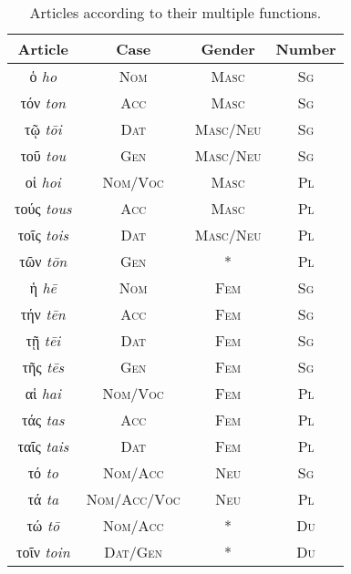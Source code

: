 \documentclass[10pt]{memoir}
\newcommand{\tsc}[1]{\textsc{#1}}
\newcommand{\grc}[1]{\fontspec{Inter}#1}
\newcommand{\trc}[1]{\textit{\fontspec{Tinos}#1}}
\begin{document}
    \begin{table}[H]
        \begin{tabular}{c|ccc}
            \textbf{Article} & \textbf{Case} & \textbf{Gender} & \textbf{Number} \\
            \hline
            \grc{ὁ} \trc{ho}           & \tsc{Nom}           & \tsc{Masc}            & \tsc{Sg}              \\
            \grc{τόν} \trc{ton}        & \tsc{Acc}           & \tsc{Masc}            & \tsc{Sg}              \\
            \grc{τῷ} \trc{tōi}         & \tsc{Dat}           & \tsc{Masc}/\tsc{Neu}        & \tsc{Sg}              \\
            \grc{τοῦ} \trc{tou}        & \tsc{Gen}           & \tsc{Masc}/\tsc{Neu}        & \tsc{Sg}              \\
            \grc{οἱ} \trc{hoi}         & \tsc{Nom}/\tsc{Voc}       & \tsc{Masc}            & \tsc{Pl}              \\
            \grc{τούς} \trc{tous}      & \tsc{Acc}           & \tsc{Masc}            & \tsc{Pl}              \\
            \grc{τοῖς} \trc{tois}      & \tsc{Dat}           & \tsc{Masc}/\tsc{Neu}        & \tsc{Pl}              \\
            \grc{τῶν} \trc{tōn}        & \tsc{Gen}           & *             & \tsc{Pl}              \\
            \grc{ἡ} \trc{hē}           & \tsc{Nom}           & \tsc{Fem}             & \tsc{Sg}              \\
            \grc{τήν} \trc{tēn}        & \tsc{Acc}           & \tsc{Fem}             & \tsc{Sg}              \\
            \grc{τῇ} \trc{tēi}         & \tsc{Dat}           & \tsc{Fem}             & \tsc{Sg}              \\
            \grc{τῆς} \trc{tēs}        & \tsc{Gen}           & \tsc{Fem}             & \tsc{Sg}              \\
            \grc{αἱ} \trc{hai}         & \tsc{Nom}/\tsc{Voc}       & \tsc{Fem}             & \tsc{Pl}              \\
            \grc{τάς} \trc{tas}        & \tsc{Acc}           & \tsc{Fem}             & \tsc{Pl}              \\
            \grc{ταῖς} \trc{tais}      & \tsc{Dat}           & \tsc{Fem}             & \tsc{Pl}              \\
            \grc{τό} \trc{to}          & \tsc{Nom}/\tsc{Acc}       & \tsc{Neu}             & \tsc{Sg}              \\
            \grc{τά} \trc{ta}          & \tsc{Nom}/\tsc{Acc}/\tsc{Voc}   & \tsc{Neu}             & \tsc{Pl}              \\
            \grc{τώ} \trc{tō}          & \tsc{Nom}/\tsc{Acc}       & *             & \tsc{Du}              \\
            \grc{τοῖν} \trc{toin}      & \tsc{Dat}/\tsc{Gen}       & *             & \tsc{Du}
        \end{tabular}
        \caption{Articles according to their multiple functions.}
    \end{table}
\end{document}
